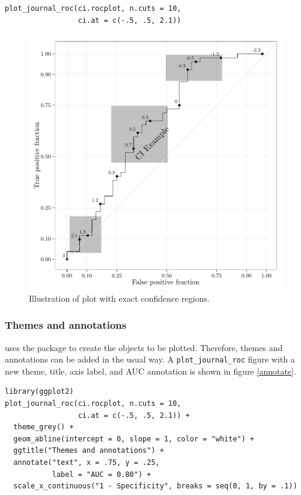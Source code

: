 \documentclass[article]{jss}
\begin{document}
\begin{verbatim}
plot_journal_roc(ci.rocplot, n.cuts = 10, 
                 ci.at = c(-.5, .5, 2.1))
\end{verbatim}

\begin{figure}[htbp]
\centering
\includegraphics{figure/printci-1.pdf}
\caption{Illustration of  plot with exact confidence
regions. \label{conf}}
\end{figure}

\subsubsection{Themes and annotations}\label{themes-and-annotations}

 uses the  package to create the objects to be
plotted. Therefore, themes and annotations can be added in the usual
 way. A \texttt{plot\_journal\_roc} figure with a new
theme, title, axis label, and AUC annotation is shown in figure
\ref{annotate}.

\begin{verbatim}
library(ggplot2)
plot_journal_roc(ci.rocplot, n.cuts = 10, 
                 ci.at = c(-.5, .5, 2.1)) + 
  theme_grey() + 
  geom_abline(intercept = 0, slope = 1, color = "white") + 
  ggtitle("Themes and annotations") + 
  annotate("text", x = .75, y = .25, 
           label = "AUC = 0.80") +
  scale_x_continuous("1 - Specificity", breaks = seq(0, 1, by = .1))
\end{verbatim}
\end{document}
